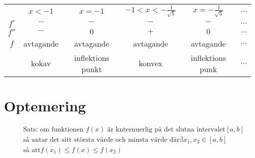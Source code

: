 \begin{center}
\begin{tabular}{ |c|c|c|c|c|c| } 
 \hline
        & $x<-1$    & $x=-1$            & $-1<x<-\frac{1}{\sqrt{5}}$ & $x=-\frac{1}{\sqrt{5}}$ & $\dots$ \\ 
 $f'$   & $-$       & $-$               & $-$                        & $-$                     & $\dots$ \\ 
 $f''$  & $-$       & $0$               & $+$                        & $0$                     & $\dots$ \\
 $f$    & avtagande & avtagande         & avtagande                  & avtagande               & $\dots$ \\
        & kokav     & inflektions punkt & konvex                     & inflektions punk        & $\dots$ \\
 \hline
\end{tabular}
\end{center}


\newpage


\section{Optemering}
\begin{align*}
  &\quad  \text{Sats: om funktionen $f(x)$ är knternuerlig på det slutna intervalet} [a,b] \\
  &\quad  \text{så antar det sitt största värde och minsta värde där} \exists x_1,x_2\in[a,b] \\
  &\quad  \text{så att} f(x_1) \leq f(x) \leq f(x_2)  \\
\end{align*}

